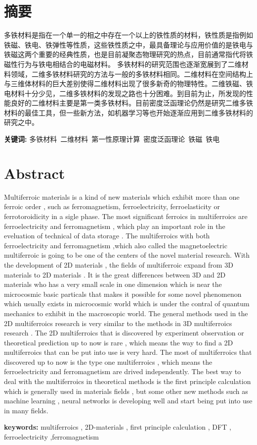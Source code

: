 \chapter*{摘要}

    多铁材料是指在一个单一的相之中存在一个以上的铁性质的材料，铁性质是指例如铁磁、铁电、铁弹性等性质，这些铁性质之中，最具备理论与应用价值的是铁电与铁磁这两个重要的经典性质，也是目前凝聚态物理研究的热点，目前通常指代将铁磁性行为与铁电相结合的电磁材料。
    多铁材料的研究范围也逐渐宽展到了二维材料领域，二维多铁材料研究的方法与一般的多铁材料相同。二维材料在空间结构上与三维体材料的巨大差别使得二维材料出现了很多新奇的物理特性。二维铁磁、铁电材料十分少见，二维多铁材料的发现之路也十分困难。到目前为止，所发现的性能良好的二维材料主要是第一类多铁材料。目前密度泛函理论仍然是研究二维多铁材料的最佳工具，但一些新方法，如机器学习等也开始逐渐应用到二维多铁材料的研究之中。
    
    \textbf{关键词:} 多铁材料\ 二维材料\ 第一性原理计算\ 密度泛函理论\ 铁磁\ 铁电
    
\chapter*{Abstract}

    Multiferroic materials is a kind of new materials which exhibit more than one ferroic order , such as ferromagnetism, ferroelectricity, ferroelasticity or ferrotoroidicity in a sigle phase. The most significant ferroics in multiferroics are ferroelectricity and ferromagnetism , which play an important role in the eveluation of technical of data storage . The multiferroics with both ferroelectricity and ferromagnetism ,which also called the magnetoelectric multiferroic is going to be one of the centers of the novel material research. With the development of 2D materials , the fields of multiferroic expand from 3D materials to 2D materials . It is the great differences between 3D and 2D materials who has a very small scale in one dimension which is near the microcosmic basic particals that makes it possible for some novel phenomenon which usually exists in microcosmic world which is under the  contral of quantum mechanics to exhibit in the macroscopic world. The general methods used in the 2D multiferroics research is very similar to the methods in 3D multiferroics research . The 2D multiferroics that is discovered by experiment observation or theoretical prediction up to now  is rare , which means the way to find a 2D multiferroics that can be put into use is very hard. The most of multiferroics that discovered up to now is the type one multiferroics , which means the ferroelectricity and ferromagnetism are drived independently. The best way to deal with the multiferroics in theoretical methods is the first principle calculation which is generally used in materials fields , but some other new methods such as machine learning , neural networks is developing well and start being put into use in many fields.

 
    \textbf{keywords:} multiferroics , 2D-materials , first principle calculation ,  DFT , ferroelectricity ,ferromagnetism    
    
    
